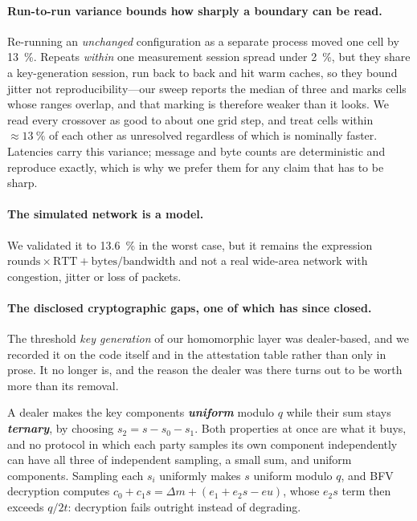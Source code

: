 \documentclass[11pt]{article}
\newcommand{\ib}[1]{\textbf{\emph{#1}}}
\begin{document}
\paragraph{Run-to-run variance bounds how sharply a boundary can be read.} Re-running an
\emph{unchanged} configuration as a separate process moved one cell by \SI{13}{\percent}.
Repeats \emph{within} one measurement session spread under \SI{2}{\percent}, but they share a
key-generation session, run back to back and hit warm caches, so they bound jitter not reproducibility---our sweep reports the median of three and marks cells whose ranges
overlap, and that marking is therefore weaker than it looks. We read every crossover as good
to about one grid step, and treat cells within ${\approx}\SI{13}{\percent}$ of each other as
unresolved regardless of which is nominally faster. Latencies carry this variance; message
and byte counts are deterministic and reproduce exactly, which is why we prefer them for any
claim that has to be sharp.

\paragraph{The simulated network is a model.} We validated it to \SI{13.6}{\percent} in the
worst case, but it remains the expression $\text{rounds}\times\text{RTT} +
\text{bytes}/\text{bandwidth}$ and not a real wide-area network with congestion, jitter or loss of
packets.

\paragraph{The disclosed cryptographic gaps, one of which has since closed.} The threshold
\emph{key generation} of our homomorphic layer was dealer-based, and we recorded it on the code
itself and in the attestation table rather than only in prose. It no longer is, and the reason the
dealer was there turns out to be worth more than its removal.

A dealer makes the key components \ib{uniform} modulo $q$ while their sum stays \ib{ternary}, by
choosing $s_2 = s - s_0 - s_1$. Both properties at once are what it buys, and no protocol in which
each party samples its own component independently can have all three of independent sampling, a
small sum, and uniform components. Sampling each $s_i$ uniformly makes $s$ uniform modulo $q$, and
BFV decryption computes $c_0 + c_1 s = \Delta m + (e_1 + e_2 s - e u)$, whose $e_2 s$ term then
exceeds $q/2t$: decryption fails outright instead of degrading.
\end{document}
